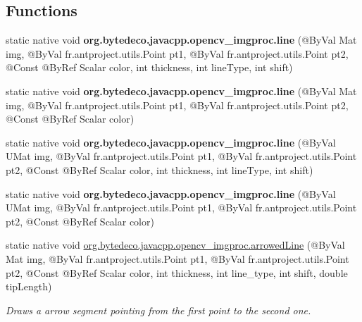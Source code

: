 \subsection*{Functions}
\begin{DoxyCompactItemize}
\item 
\mbox{\label{group__imgproc__draw_ga09dfe9f2e6b788aa42a900719ec2bb80}} 
static native void {\bfseries org.\+bytedeco.\+javacpp.\+opencv\+\_\+imgproc.\+line} (@By\+Val Mat img, @By\+Val fr.antproject.utils.Point pt1, @By\+Val fr.antproject.utils.Point pt2, @Const @By\+Ref Scalar color, int thickness, int line\+Type, int shift)
\item 
\mbox{\label{group__imgproc__draw_ga9332d09ef0ec098c1bfa58e6f517581f}} 
static native void {\bfseries org.\+bytedeco.\+javacpp.\+opencv\+\_\+imgproc.\+line} (@By\+Val Mat img, @By\+Val fr.antproject.utils.Point pt1, @By\+Val fr.antproject.utils.Point pt2, @Const @By\+Ref Scalar color)
\item 
\mbox{\label{group__imgproc__draw_ga4e4da35ed5a3bceec6408c2d527955c7}} 
static native void {\bfseries org.\+bytedeco.\+javacpp.\+opencv\+\_\+imgproc.\+line} (@By\+Val U\+Mat img, @By\+Val fr.antproject.utils.Point pt1, @By\+Val fr.antproject.utils.Point pt2, @Const @By\+Ref Scalar color, int thickness, int line\+Type, int shift)
\item 
\mbox{\label{group__imgproc__draw_ga9bfe92fd25b7e3b758bc8e4c0db3a97a}} 
static native void {\bfseries org.\+bytedeco.\+javacpp.\+opencv\+\_\+imgproc.\+line} (@By\+Val U\+Mat img, @By\+Val fr.antproject.utils.Point pt1, @By\+Val fr.antproject.utils.Point pt2, @Const @By\+Ref Scalar color)
\item 
static native void \hyperlink{group__imgproc__draw_gae4f0557739b8a995e8297d30b3d8a00c}{org.\+bytedeco.\+javacpp.\+opencv\+\_\+imgproc.\+arrowed\+Line} (@By\+Val Mat img, @By\+Val fr.antproject.utils.Point pt1, @By\+Val fr.antproject.utils.Point pt2, @Const @By\+Ref Scalar color, int thickness, int line\+\_\+type, int shift, double tip\+Length)
\begin{DoxyCompactList}\small\item\em Draws a arrow segment pointing from the first point to the second one. \end{DoxyCompactList}\item 

\end{DoxyCompactItemize}
